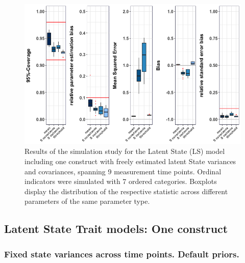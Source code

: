  \begin{figure}[H]
 \begin{adjustwidth}{-1cm}{-1cm}
    \begin{center}
  \includegraphics[width=1\textwidth]{Boxplot_LatentState_freeSvar_7categ.png}
   \end{center}
    \end{adjustwidth}
      \captionsetup{skip=10pt,width=1.05\textwidth}
\caption[Results LS 7 categ]{Results of the simulation study for the Latent State (LS) model including one construct with freely estimated latent State variances and covariances, spanning 9 measurement time points. Ordinal indicators were simulated with 7 ordered categories. Boxplots display the distribution of the respective statistic across different parameters of the same parameter type.}
\label{Fig: LS one free 7 categ}
\end{figure}


\subsection{Latent State Trait models: One construct}
  \subsubsection{Fixed state variances across time points. Default priors.}

